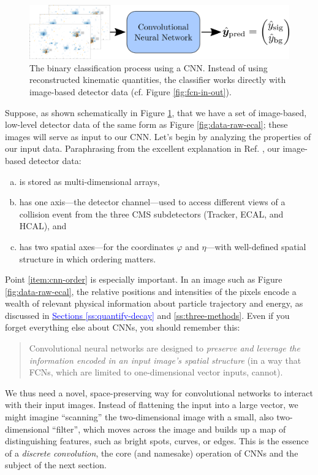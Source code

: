 \documentclass[11pt, a4paper]{article}
\newcommand{\myhref}[2]{\hyperref[#1]{\textcolor{blue}{#2}}}
\begin{document}
\begin{figure}[htb!]
    \centering
    \includegraphics[width=0.9\linewidth]{raster/raster-svg/cnn-in-out.png}
    \caption{The binary classification process using a CNN. Instead of using reconstructed kinematic quantities, the classifier works directly with image-based detector data (cf. Figure \ref{fig:fcn-in-out}).}
    \label{fig:ccn-in-out}
\end{figure}

Suppose, as shown schematically in Figure \ref{fig:ccn-in-out}, that we have a set of image-based, low-level detector data of the same form as Figure \ref{fig:data-raw-ecal}; these images will serve as input to our CNN. Let's begin by analyzing the properties of our input data. Paraphrasing from the excellent explanation in Ref. \cite{cnn-guide}, our image-based detector data:
\begin{enumerate}[(a)]

    \item is stored as multi-dimensional arrays,

    \item has one axis---the detector channel---used to access different views of a collision event from the three CMS subdetectors (Tracker, ECAL, and HCAL), and %

    \item \label{item:cnn-order} has two spatial axes---for the coordinates $ \varphi $ and $ \eta $---with well-defined spatial structure in which ordering matters.

\end{enumerate}
Point \ref{item:cnn-order} is especially important. In an image such as Figure \ref{fig:data-raw-ecal}, the relative positions and intensities of the pixels encode a wealth of relevant physical information about particle trajectory and energy, as discussed in \myhref{ss:quantify-decay}{Sections \ref{ss:quantify-decay}} and \ref{ss:three-methods}. Even if you forget everything else about CNNs, you should remember this:
\begin{quote}
    Convolutional neural networks are designed to \textit{preserve and leverage the information encoded in an input image's spatial structure} (in a way that FCNs, which are limited to one-dimensional vector inputs, cannot).
\end{quote}
We thus need a novel, space-preserving way for convolutional networks to interact with their input images. Instead of flattening the input into a large vector, we might imagine ``scanning'' the two-dimensional image with a small, also two-dimensional ``filter'', which moves across the image and builds up a map of distinguishing features, such as bright spots, curves, or edges. This is the essence of a \textit{discrete convolution}, the core (and namesake) operation of CNNs and the subject of the next section.
\end{document}
